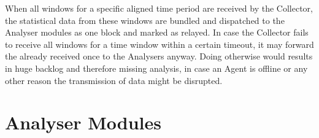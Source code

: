 When all windows for a specific aligned time period are received by the Collector, the statistical data from these windows are bundled and dispatched to the Analyser modules as one block and marked as relayed.
In case the Collector fails to receive all windows for a time window within a certain timeout, it may forward the already received once to the Analysers anyway.
Doing otherwise would results in huge backlog and therefore missing analysis, in case an Agent is offline or any other reason the transmission of data might be disrupted.

\section{Analyser Modules}
\label{sec:concept:anal}

